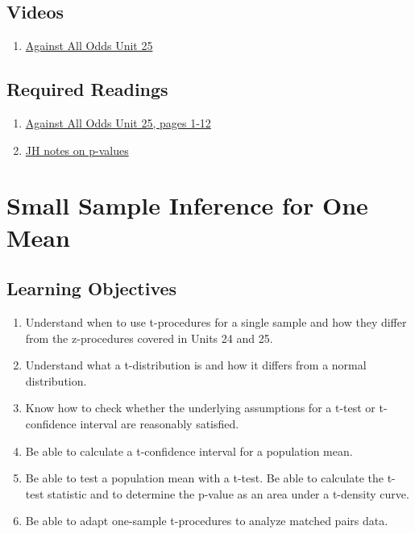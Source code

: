 \documentclass[letterpaper,10pt,twocolumn,twoside,]{pinp}
\providecommand{\tightlist}{%
  \setlength{\itemsep}{0pt}\setlength{\parskip}{0pt}}
\begin{document}
\hypertarget{videos}{%
\subsection{Videos}\label{videos}}

\begin{enumerate}
\def\labelenumi{\arabic{enumi}.}
\tightlist
\item
  \href{https://www.learner.org/series/against-all-odds-inside-statistics/tests-of-significance/}{Against
  All Odds Unit 25}
\end{enumerate}

\hypertarget{required-readings-1}{%
\subsection{Required Readings}\label{required-readings-1}}

\begin{enumerate}
\item \href{https://www.learner.org/wp-content/uploads/2019/03/AgainstAllOdds_StudentGuide_Unit25-Tests-of-Significance.pdf}{Against All Odds Unit 25, pages 1-12}
\item \href{http://www.medicine.mcgill.ca/epidemiology/hanley/BionanoWorkshop/P-Values.pdf}{JH notes on p-values}
\end{enumerate}

\hypertarget{small-sample-inference-for-one-mean}{%
\section{Small Sample Inference for One
Mean}\label{small-sample-inference-for-one-mean}}

\hypertarget{learning-objectives-2}{%
\subsection{Learning Objectives}\label{learning-objectives-2}}

\begin{enumerate}
\def\labelenumi{\arabic{enumi}.}
\tightlist
\item
  Understand when to use t-procedures for a single sample and how they
  differ from the z-procedures covered in Units 24 and 25.
\item
  Understand what a t-distribution is and how it differs from a normal
  distribution.
\item
  Know how to check whether the underlying assumptions for a t-test or
  t-confidence interval are reasonably satisfied.
\item
  Be able to calculate a t-confidence interval for a population mean.
\item
  Be able to test a population mean with a t-test. Be able to calculate
  the t-test statistic and to determine the p-value as an area under a
  t-density curve.
\item
  Be able to adapt one-sample t-procedures to analyze matched pairs
  data.
\end{enumerate}
\end{document}

